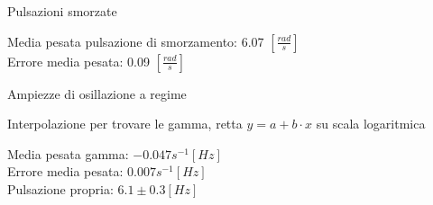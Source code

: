 %	

\begin{tabella}
	\centering
	
	\caption{Pulsazioni smorzate}
	\label{tab:pulssmorz}
\end{tabella}
Media pesata pulsazione di smorzamento: 6.07 $[\frac{rad}{s}]$ \\
Errore media pesata: 0.09 $[\frac{rad}{s}]$ \\


\begin{tabella}
	\centering
	
	\caption{Ampiezze di osillazione a regime}
	\label{tab:regime}
\end{tabella}

\begin{tabella}
	\centering
	
	\caption{Interpolazione per trovare le gamma, retta $y=a+b \cdot x$ su scala logaritmica}
	\label{tab:gamma}
\end{tabella}
\noindent 
Media pesata gamma: $-0.047 s^{-1} [Hz] $\\
Errore media pesata: $0.007 s^{-1} [Hz] $\\
Pulsazione propria: $6.1 \pm 0.3 [Hz]$\\
